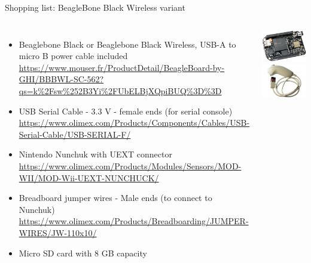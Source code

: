 \begin{frame}[fragile]{Shopping list: BeagleBone Black Wireless variant}
  \begin{columns}
    \begin{itemize}
    \item Beaglebone Black or Beaglebone Black Wireless, USB-A to
      micro B power cable included
      {\fontsize{6}{6}\selectfont
        \url{https://www.mouser.fr/ProductDetail/BeagleBoard-by-GHI/BBBWL-SC-562?qs=k%2Fsw%252B3Yi%2FUbELBjXQpiBUQ%3D%3D}
      }
    \item USB Serial Cable - 3.3 V - female ends (for serial console)
      {\fontsize{6}{6}\selectfont
        \url{https://www.olimex.com/Products/Components/Cables/USB-Serial-Cable/USB-SERIAL-F/}
      }
    \item Nintendo Nunchuk with UEXT connector
      {\fontsize{6}{6}\selectfont
        \url{https://www.olimex.com/Products/Modules/Sensors/MOD-WII/MOD-Wii-UEXT-NUNCHUCK/}
      }
    \item Breadboard jumper wires - Male ends (to connect to Nunchuk)
      {\fontsize{6}{6}\selectfont
        \url{https://www.olimex.com/Products/Breadboarding/JUMPER-WIRES/JW-110x10/}
      }
    \item Micro SD card with 8 GB capacity
    \end{itemize}
    \begin{center}
      \includegraphics[height=0.2\textheight]{slides/beagleboneblack-board/beagleboneblack.png} \\
      \includegraphics[height=0.2\textheight]{common/nunchuk.jpg} \\

\end{center}
\end{columns}
\end{frame}
